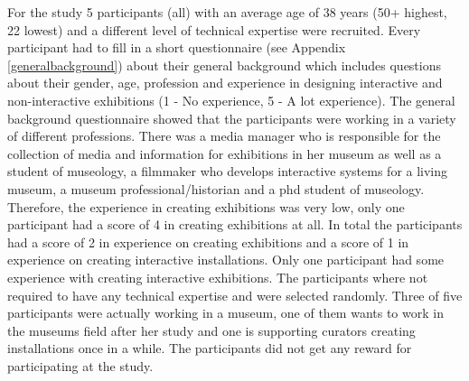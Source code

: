 For the study 5 participants (all) with an average age of 38 years (50+ highest, 22 lowest) and a different level of technical expertise were recruited. Every participant had to fill in a short questionnaire (see Appendix \ref{generalbackground}) about their general background which includes questions about their gender, age, profession and experience in designing interactive and non-interactive exhibitions (1 - No experience, 5 - A lot experience). The general background questionnaire showed that the participants were working in a variety of different professions. There was a media manager who is responsible for the collection of media and information for exhibitions in her museum as well as a student of museology, a filmmaker who develops interactive systems for a living museum, a museum professional/historian and a phd student of museology.  Therefore, the experience in creating exhibitions was very low, only one participant had a score of 4 in creating exhibitions at all. In total the participants had a score of 2 in experience on creating exhibitions and a score of 1 in experience on creating interactive installations. Only one participant had some experience with creating interactive exhibitions. The participants where not required to have any technical expertise and were selected randomly. Three of five participants were actually working in a museum, one of them wants to work in the museums field after her study and one is supporting curators creating installations once in a while. The participants did not get any reward for participating at the study.

